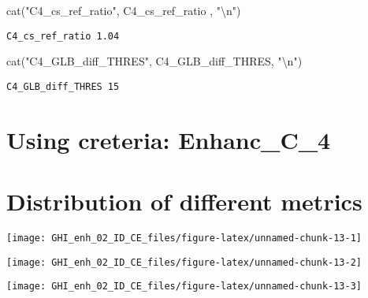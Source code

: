 \documentclass[
  10pt,
  a4paper,oneside]{article}
\newenvironment{Shaded}{\begin{snugshade}}{\end{snugshade}}
\newcommand{\FunctionTok}[1]{\textcolor[rgb]{0.00,0.00,0.00}{#1}}
\newcommand{\NormalTok}[1]{#1}
\newcommand{\SpecialCharTok}[1]{\textcolor[rgb]{0.00,0.00,0.00}{#1}}
\newcommand{\StringTok}[1]{\textcolor[rgb]{0.31,0.60,0.02}{#1}}
\begin{document}
\begin{Shaded}
\begin{Highlighting}[]
\FunctionTok{cat}\NormalTok{(}\StringTok{"C4\_cs\_ref\_ratio"}\NormalTok{,    C4\_cs\_ref\_ratio  , }\StringTok{"}\SpecialCharTok{\textbackslash{}n}\StringTok{"}\NormalTok{)}
\end{Highlighting}
\end{Shaded}

\begin{verbatim}
C4_cs_ref_ratio 1.04 
\end{verbatim}

\begin{Shaded}
\begin{Highlighting}[]
\FunctionTok{cat}\NormalTok{(}\StringTok{"C4\_GLB\_diff\_THRES"}\NormalTok{,  C4\_GLB\_diff\_THRES, }\StringTok{"}\SpecialCharTok{\textbackslash{}n}\StringTok{"}\NormalTok{)}
\end{Highlighting}
\end{Shaded}

\begin{verbatim}
C4_GLB_diff_THRES 15 
\end{verbatim}

\FloatBarrier

\hypertarget{using-creteria-enhanc_c_4}{%
\section{Using creteria: Enhanc\_C\_4}\label{using-creteria-enhanc_c_4}}

\hypertarget{distribution-of-different-metrics}{%
\section{Distribution of different metrics}\label{distribution-of-different-metrics}}

\begin{center}\texttt{[image: GHI\_enh\_02\_ID\_CE\_files/figure-latex/unnamed-chunk-13-1]} \end{center}

\begin{center}\texttt{[image: GHI\_enh\_02\_ID\_CE\_files/figure-latex/unnamed-chunk-13-2]} \end{center}

\begin{center}\texttt{[image: GHI\_enh\_02\_ID\_CE\_files/figure-latex/unnamed-chunk-13-3]} \end{center}
\end{document}
